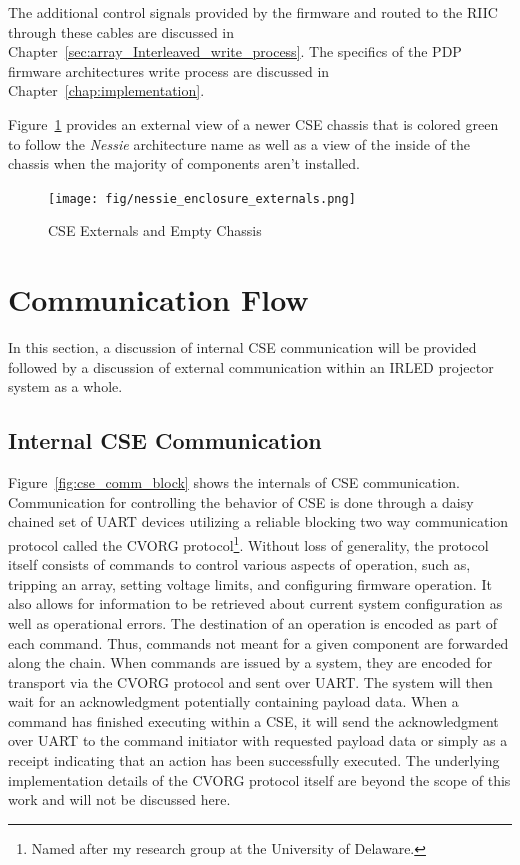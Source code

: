     The additional control signals provided by the firmware and routed to the RIIC through these cables are discussed in Chapter~\ref{sec:array_Interleaved_write_process}. The specifics of the PDP firmware architectures write process are discussed in Chapter~\ref{chap:implementation}.

    Figure~\ref{fig:nessie_enclosure_externals} provides an external view of a newer CSE chassis that is colored green to follow the {\it Nessie} architecture name as well as a view of the inside of the chassis when the majority of components aren't installed.

    \begin{figure}
        \centering
        \texttt{[image: fig/nessie\_enclosure\_externals.png]}
        \caption{CSE Externals and Empty Chassis}
        \label{fig:nessie_enclosure_externals}
    \end{figure}

\section{Communication Flow}
    In this section, a discussion of internal CSE communication will be provided followed by a discussion of external communication within an IRLED projector system as a whole.

    \subsection{Internal CSE Communication}
        Figure~\ref{fig:cse_comm_block} shows the internals of CSE communication. Communication for controlling the behavior of CSE is done through a daisy chained set of UART devices utilizing a reliable blocking two way communication protocol called the CVORG protocol\footnote{Named after my research group at the University of Delaware.}. Without loss of generality, the protocol itself consists of commands to control various aspects of operation, such as, tripping an array, setting voltage limits, and configuring firmware operation. It also allows for information to be retrieved about current system configuration as well as operational errors. The destination of an operation is encoded as part of each command. Thus, commands not meant for a given component are forwarded along the chain. When commands are issued by a system, they are encoded for transport via the CVORG protocol and sent over UART. The system will then wait for an acknowledgment potentially containing payload data. When a command has finished executing within a CSE, it will send the acknowledgment over UART to the command initiator with requested payload data or simply as a receipt indicating that an action has been successfully executed. The underlying implementation details of the CVORG protocol itself are beyond the scope of this work and will not be discussed here.

